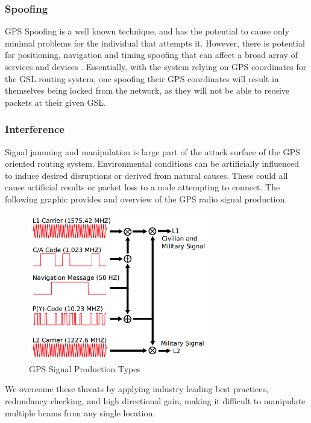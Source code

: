 \documentclass[11pt]{article}
\begin{document}
\subsubsection{Spoofing}

GPS Spoofing is a well known technique, and has the potential to cause only minimal problems for the individual that attempts it.
However, there is potential for positioning, navigation and timing spoofing that can affect a broad array of services and devices \cite{GPS-signal}.
Essentially, with the system relying on GPS coordinates for the GSL routing system, one spoofing their GPS coordinates will result in themselves being locked from the network, as they will not be able to receive packets at their given GSL.


\subsubsection{Interference}

Signal jamming and manipulation is large  part of the attack surface of the GPS oriented routing system.
Environmental conditions can be artificially influenced to induce desired disruptions or derived from natural causes.
These could all cause artificial results or packet loss to a node attempting to connect.
The following graphic provides and overview of the GPS radio signal production.

\begin{figure}[h]
    \centering
    \includegraphics[width=0.7\textwidth]{./images/rsz_gps_types.png}
    \caption{GPS Signal Production Types \cite{GPS-signal}}
\end{figure}

\noindent We overcome these threats by applying industry leading best practices, redundancy checking, and high directional gain, making it difficult to manipulate multiple beams from any single location.
\end{document}
